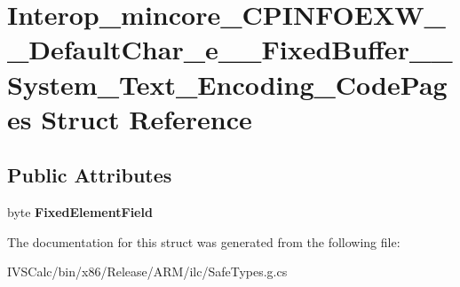 \hypertarget{struct_interop__mincore___c_p_i_n_f_o_e_x_w_____default_char__e_____fixed_buffer_____system___text___encoding___code_pages}{}\section{Interop\+\_\+mincore\+\_\+\+C\+P\+I\+N\+F\+O\+E\+X\+W\+\_\+\+\_\+\+Default\+Char\+\_\+e\+\_\+\+\_\+\+Fixed\+Buffer\+\_\+\+\_\+\+System\+\_\+\+Text\+\_\+\+Encoding\+\_\+\+Code\+Pages Struct Reference}
\label{struct_interop__mincore___c_p_i_n_f_o_e_x_w_____default_char__e_____fixed_buffer_____system___text___encoding___code_pages}
\subsection*{Public Attributes}
\begin{DoxyCompactItemize}
\item 
\mbox{\label{struct_interop__mincore___c_p_i_n_f_o_e_x_w_____default_char__e_____fixed_buffer_____system___text___encoding___code_pages_a0a142fa43167898b1fa9387e348b0a32}} 
byte {\bfseries Fixed\+Element\+Field}
\end{DoxyCompactItemize}


The documentation for this struct was generated from the following file\+:\begin{DoxyCompactItemize}
\item 
I\+V\+S\+Calc/bin/x86/\+Release/\+A\+R\+M/ilc/Safe\+Types.\+g.\+cs\end{DoxyCompactItemize}

